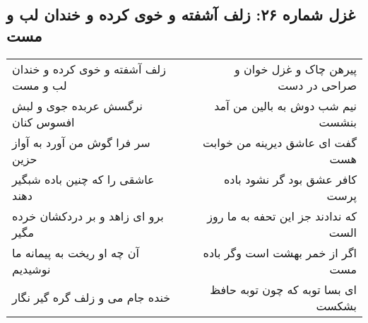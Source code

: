 \begin{center}
\section*{غزل شماره ۲۶: زلف آشفته و خوی کرده و خندان لب و مست}
\label{sec:sh026}
\begin{longtable}{l p{0.5cm} r}
زلف آشفته و خوی کرده و خندان لب و مست
&&
پیرهن چاک و غزل خوان و صراحی در دست
\\
نرگسش عربده جوی و لبش افسوس کنان
&&
نیم شب دوش به بالین من آمد بنشست
\\
سر فرا گوش من آورد به آواز حزین
&&
گفت ای عاشق دیرینه من خوابت هست
\\
عاشقی را که چنین باده شبگیر دهند
&&
کافر عشق بود گر نشود باده پرست
\\
برو ای زاهد و بر دردکشان خرده مگیر
&&
که ندادند جز این تحفه به ما روز الست
\\
آن چه او ریخت به پیمانه ما نوشیدیم
&&
اگر از خمر بهشت است وگر باده مست
\\
خنده جام می و زلف گره گیر نگار
&&
ای بسا توبه که چون توبه حافظ بشکست
\\
\end{longtable}
\end{center}
